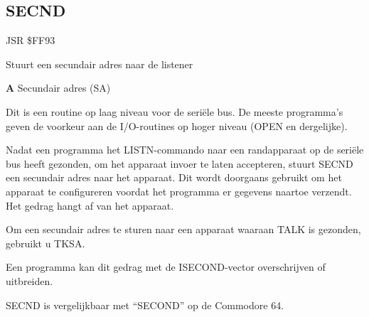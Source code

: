 \subsection{SECND}
\label{KERNAL Jump Table!SECND}
\begin{description}[leftmargin=2cm,style=nextline]
    \item [Adres:] JSR \$FF93    \item [Omschrijving:] Stuurt een secundair adres naar de listener    \item [Invoer:]        \textbf{A} Secundair adres (SA)    \item [Opmerkingen:]        Dit is een routine op laag niveau voor de seriële bus. De meeste programma's geven de voorkeur aan de I/O-routines op hoger niveau (OPEN en dergelijke).

        Nadat een programma het LISTN-commando naar een randapparaat op de seriële bus heeft gezonden, om het apparaat invoer te laten accepteren, stuurt SECND een secundair adres naar het apparaat. Dit wordt doorgaans gebruikt om het apparaat te configureren voordat het programma er gegevens naartoe verzendt. Het gedrag hangt af van het apparaat.

        Om een secundair adres te sturen naar een apparaat waaraan TALK is gezonden, gebruikt u TKSA.

        Een programma kan dit gedrag met de ISECOND-vector overschrijven of uitbreiden.

        SECND is vergelijkbaar met ``SECOND'' op de Commodore 64.

    \item [Voorbeeld:]
\end{description}



\newpage
